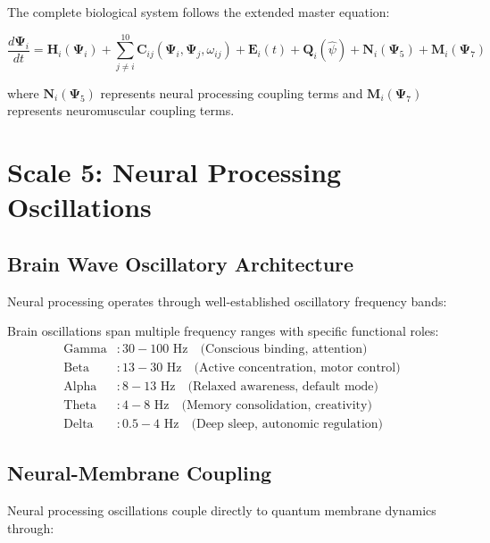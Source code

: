 \documentclass[twocolumn]{article}
\begin{document}
The complete biological system follows the extended master equation:

\begin{equation}
\frac{d\mathbf{\Psi}_i}{dt} = \mathbf{H}_i(\mathbf{\Psi}_i) + \sum_{j \neq i}^{10} \mathbf{C}_{ij}(\mathbf{\Psi}_i, \mathbf{\Psi}_j, \omega_{ij}) + \mathbf{E}_i(t) + \mathbf{Q}_i(\hat{\psi}) + \mathbf{N}_i(\mathbf{\Psi}_5) + \mathbf{M}_i(\mathbf{\Psi}_7)
\label{eq:complete_master}
\end{equation}

where $\mathbf{N}_i(\mathbf{\Psi}_5)$ represents neural processing coupling terms and $\mathbf{M}_i(\mathbf{\Psi}_7)$ represents neuromuscular coupling terms.

\section{Scale 5: Neural Processing Oscillations}

\subsection{Brain Wave Oscillatory Architecture}

Neural processing operates through well-established oscillatory frequency bands:

\begin{definition}
Brain oscillations span multiple frequency ranges with specific functional roles:
\begin{align}
\text{Gamma} &: 30-100 \text{ Hz} \quad \text{(Conscious binding, attention)} \\
\text{Beta} &: 13-30 \text{ Hz} \quad \text{(Active concentration, motor control)} \\
\text{Alpha} &: 8-13 \text{ Hz} \quad \text{(Relaxed awareness, default mode)} \\
\text{Theta} &: 4-8 \text{ Hz} \quad \text{(Memory consolidation, creativity)} \\
\text{Delta} &: 0.5-4 \text{ Hz} \quad \text{(Deep sleep, autonomic regulation)}
\end{align}
\end{definition}

\subsection{Neural-Membrane Coupling}

Neural processing oscillations couple directly to quantum membrane dynamics through:
\end{document}
